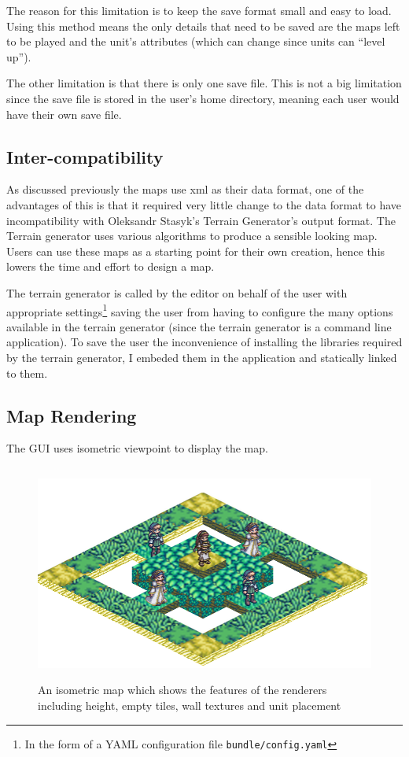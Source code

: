 The reason for this limitation is to keep the save format small and easy to load. Using this method means the only details that need to be saved are the maps left to be played and the unit's attributes (which can change since units can ``level up''). 

The other limitation is that there is only one save file. This is not a big limitation since the  save file is stored in the user's home directory, meaning each user would have their own save file.

\subsection{Inter-compatibility}
\label{ssub:intercompatibility}
As discussed previously the maps use xml as their data format, one of the advantages of this is that it required very little change to the data format to have incompatibility with Oleksandr Stasyk's  Terrain Generator's output format.  The Terrain generator uses various algorithms to produce a sensible looking map. Users can use these maps as a starting point for their own creation, hence this lowers the time and effort to design a map.

The terrain generator is called by the editor on behalf of the user with appropriate settings\footnote{In the form of a YAML configuration file \texttt{bundle/config.yaml}} saving the user from having to configure the many options available in the terrain generator (since the terrain generator is a command line application). To save the user the inconvenience of installing the libraries required by the terrain generator, I embeded them in the application and statically linked to them.

\subsection{Map Rendering}
\label{ssub:map_rendering}

The GUI uses isometric viewpoint to display the map. 
\begin{figure}[htbp]
	\centering
		\includegraphics[height=2.8in]{figures/imp-map.png}
	\caption{An isometric map which shows the features of the renderers including height, empty tiles, wall textures and unit placement}
	\label{fig:figures_imp-map}
\end{figure}

